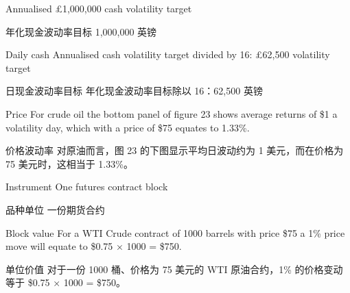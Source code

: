 \bipairgap

\begin{englishblock} Annualised £1,000,000 cash volatility target \end{englishblock}

\begin{chineseblock}年化现金波动率目标 1,000,000 英镑\end{chineseblock}

\bipairgap

\begin{englishblock} Daily cash Annualised cash volatility target divided by 16: £62,500 volatility target \end{englishblock}

\begin{chineseblock}日现金波动率目标 年化现金波动率目标除以 16：62,500 英镑\end{chineseblock}

\bipairgap

\begin{englishblock} Price For crude oil the bottom panel of figure 23 shows average returns of \$1 a volatility day, which with a price of \$75 equates to 1.33\%. \end{englishblock}

\begin{chineseblock}价格波动率 对原油而言，图 23 的下图显示平均日波动约为 1 美元，而在价格为 75 美元时，这相当于 1.33\%。 \end{chineseblock}

\bipairgap

\begin{englishblock} Instrument One futures contract block \end{englishblock}

\begin{chineseblock}品种单位 一份期货合约\end{chineseblock}

\bipairgap

\begin{englishblock} Block value For a WTI Crude contract of 1000 barrels with price \$75 a 1\% price move will equate to \$0.75 × 1000 = \$750. \end{englishblock}

\begin{chineseblock}单位价值 对于一份 1000 桶、价格为 75 美元的 WTI 原油合约，1\% 的价格变动等于 \$0.75 × 1000 = \$750。 \end{chineseblock}

